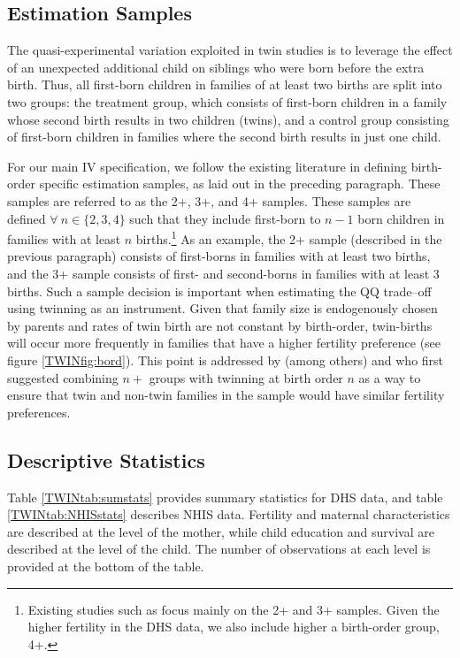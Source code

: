 \subsection{Estimation Samples}                    \label{TWINsscn:samples}
The quasi-experimental variation exploited in twin studies is to leverage the 
effect of an unexpected additional child on siblings who were born before the 
extra birth.  Thus, all first-born children in families of at least two births
are split into two groups: the treatment group, which consists of first-born
children in a family whose second birth results in two children (twins), and a
control group consisting of first-born children in families where the second
birth results in just one child.

For our main IV specification, we follow the existing literature in defining
birth-order specific estimation samples, as laid out in the preceding 
paragraph. These samples are referred to as the 2+, 3+, and 4+ samples. These 
samples are defined $\forall\ n \in \{2, 3, 4\}$ such that they include 
first-born to $n-1$ born children in families with at least $n$ births.\footnote{
Existing studies such as \citet{Angristetal2010} focus mainly on the 2+ and 3+ 
samples. Given the higher fertility in the DHS data, we also include higher a
birth-order group, 4+.} As an example, the 2+ sample (described in the previous
paragraph) consists of first-borns in families with at least two births, and the 
3+ sample consists of first- and second-borns in families with at least 3 births.
Such a sample decision is important when estimating the QQ trade--off using 
twinning as an instrument. Given that family size is endogenously chosen by 
parents and rates of twin birth are not constant by birth-order, twin-births will 
occur more frequently in families that have a higher fertility preference (see
figure \ref{TWINfig:bord}). This point is addressed by (among others) 
\citet{RosenzweigWolpin1980} and \citet{Blacketal2005} who first suggested 
combining $n+$ groups with twinning at birth order $n$ as a way to ensure that 
twin and non-twin families in the sample would have similar fertility 
preferences.

\subsection{Descriptive Statistics}                \label{TWINsscn:descriptives}
Table \ref{TWINtab:sumstats} provides summary statistics for DHS data, and table
\ref{TWINtab:NHISstats} describes NHIS data.  Fertility and maternal 
characteristics are described at the level of the mother, while child education 
and survival are described at the level of the child. The number of observations 
at each level is provided at the bottom of the table.

